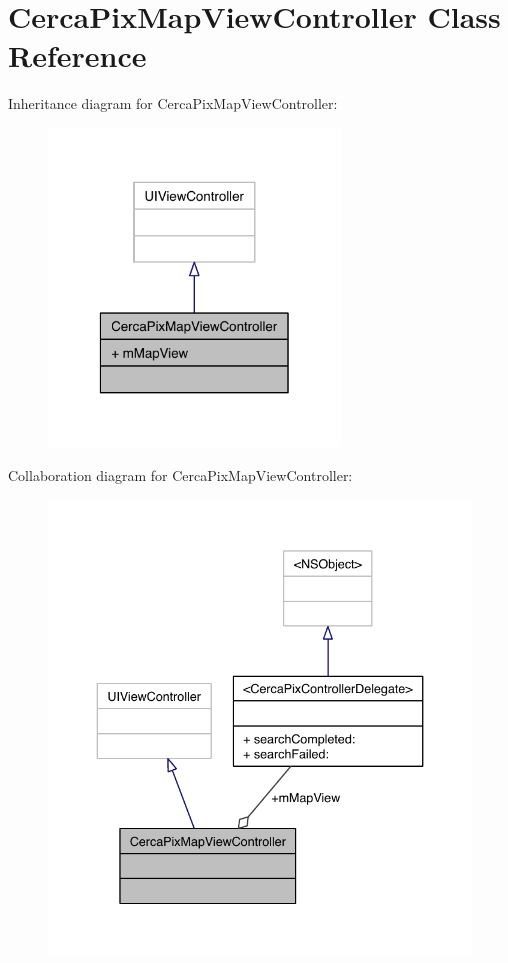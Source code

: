 \hypertarget{interface_cerca_pix_map_view_controller}{\section{Cerca\-Pix\-Map\-View\-Controller Class Reference}
\label{interface_cerca_pix_map_view_controller}
}


Inheritance diagram for Cerca\-Pix\-Map\-View\-Controller\-:\nopagebreak
\begin{figure}[H]
\begin{center}
\leavevmode
\includegraphics[width=220pt]{interface_cerca_pix_map_view_controller__inherit__graph}
\end{center}
\end{figure}


Collaboration diagram for Cerca\-Pix\-Map\-View\-Controller\-:\nopagebreak
\begin{figure}[H]
\begin{center}
\leavevmode
\includegraphics[width=339pt]{interface_cerca_pix_map_view_controller__coll__graph}
\end{center}
\end{figure}

